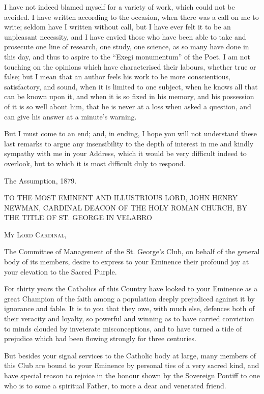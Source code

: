 I have not indeed blamed myself for a variety of work, which could
not be avoided. I have written according to the occasion, when there
was a call on me to write; seldom have I written without call, but I
have ever felt it to be an unpleasant necessity, and I have
envied those who have been able to take and prosecute one line of
research, one study, one science, as so many have done in this day,
and thus to aspire to the ``Exegi monumentum'' of the Poet. I
am not touching on the opinions which have characterised their labours,
whether true or false; but I mean that an author feels his work to be
more conscientious, satisfactory, and sound, when it is limited to one
subject, when he knows all that can be known upon it, and when it is
so fixed in his memory, and his possession of it is so well about him,
that he is never at a loss when asked a question, and can give his
answer at a minute's warning.

But I must come to an end; and, in ending, I hope you will not
understand these last remarks to argue any insensibility to the depth
of interest in me and kindly sympathy with me in your Address, which
it would be very difficult indeed to overlook, but to which it is most
difficult duly to respond.

The Assumption, 1879.



TO THE MOST
EMINENT AND ILLUSTRIOUS
LORD, JOHN HENRY
NEWMAN, CARDINAL DEACON
OF THE HOLY
ROMAN CHURCH, BY
THE TITLE OF
ST. GEORGE IN
VELABRO

M\textsc{y} L\textsc{ord} C\textsc{ardinal},

The Committee of Management of the St. George's Club, on behalf of the
general body of its members, desire to express to your Eminence their
profound joy at your elevation to the Sacred Purple.

For thirty years the Catholics of this Country have looked to your
Eminence as a great Champion of the faith among a population deeply
prejudiced against it by ignorance and fable. It is to you that they
owe, with much else, defences both of their veracity and loyalty, so
powerful and winning as to have carried conviction to minds clouded by
inveterate misconceptions, and to have turned a tide of prejudice
which had been flowing strongly for three centuries.

But besides your signal services to the Catholic body at large,
many members of this Club are bound to your Eminence by personal ties
of a very sacred kind, and have special reason to rejoice in the
honour shown by the Sovereign Pontiff to one who is to some a
spiritual Father, to more a dear and venerated friend.


